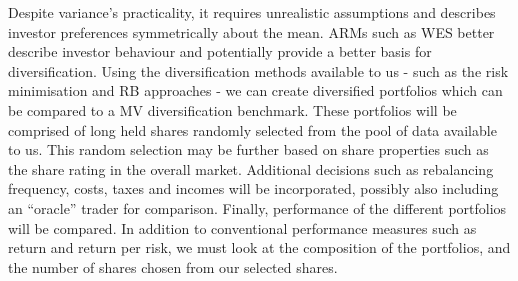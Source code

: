 \documentclass[12pt,a4paper]{article}
\begin{document}
Despite variance's practicality, it requires unrealistic assumptions and describes investor preferences symmetrically about the mean. ARMs such as WES better describe investor behaviour and potentially provide a better basis for diversification. Using the diversification methods available to us - such as the risk minimisation and RB approaches - we can create diversified portfolios which can be compared to a MV diversification benchmark. These portfolios will be comprised of long held shares randomly selected from the pool of data available to us. This random selection may be further based on share properties such as the share rating in the overall market. Additional decisions such as rebalancing frequency, costs, taxes and incomes will be incorporated, possibly also including an ``oracle'' trader for comparison. Finally, performance of the different portfolios will be compared. In addition to conventional performance measures such as return and return per risk, we must look at the composition of the portfolios, and the number of shares chosen from our selected shares.

\newpage


\label{bib:bibliography}
 
\end{document}
